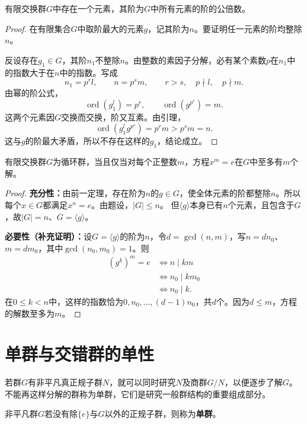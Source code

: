 \begin{theorem}\label{p2:max-order}
有限交换群$G$中存在一个元素，其阶为$G$中所有元素的阶的公倍数。
\end{theorem}
\begin{proof}
在有限集合$G$中取阶最大的元素$g$，记其阶为$n$。要证明任一元素的阶均整除$n$。

反设存在$g_1\in G$，其阶$n_1$不整除$n$。由整数的素因子分解，必有某个素数$p$在$n_1$中的指数大于在$n$中的指数。写成
\[
n_1=p^rl,\qquad n=p^sm,\qquad r>s,\quad p\nmid l,\quad p\nmid m.
\]
由幂的阶公式，
\[
\operatorname{ord}(g_1^l)=p^r,\qquad
\operatorname{ord}(g^{p^s})=m.
\]
这两个元素因$G$交换而交换，阶又互素。由引理，
\[
\operatorname{ord}(g_1^l g^{p^s})=p^rm>p^sm=n.
\]
这与$g$的阶最大矛盾，所以不存在这样的$g_1$，结论成立。
\end{proof}

\begin{theorem}\label{p2:cyclic-root-count}
有限交换群$G$为循环群，当且仅当对每个正整数$m$，方程$x^m=e$在$G$中至多有$m$个解。
\end{theorem}
\begin{proof}
\textbf{充分性：}由前一定理，存在阶为$n$的$g\in G$，使全体元素的阶都整除$n$。所以每个$x\in G$都满足$x^n=e$。由题设，$|G|\leq n$。
但$\langle g\rangle$本身已有$n$个元素，且包含于$G$，故$|G|=n$、$G=\langle g\rangle$。

\textbf{必要性（补充证明）：}设$G=\langle g\rangle$的阶为$n$，令$d=\gcd(n,m)$，写$n=dn_0$、$m=dm_0$，其中$\gcd(n_0,m_0)=1$。则
\begin{align*}
(g^k)^m=e
&\iff n\mid km\\
&\iff n_0\mid km_0\\
&\iff n_0\mid k.
\end{align*}
在$0\leq k<n$中，这样的指数恰为$0,n_0,\ldots,(d-1)n_0$，共$d$个。因为$d\leq m$，方程的解数至多为$m$。
\end{proof}

\section{单群与交错群的单性}

若群$G$有非平凡真正规子群$N$，就可以同时研究$N$及商群$G/N$，以便逐步了解$G$。不能再这样分解的群称为单群，它们是研究一般群结构的重要组成部分。

\begin{definition}
\label{p2:concept:c2-l332}非平凡群$G$若没有除$\{e\}$与$G$以外的正规子群，则称为\textbf{单群}。
\end{definition}

